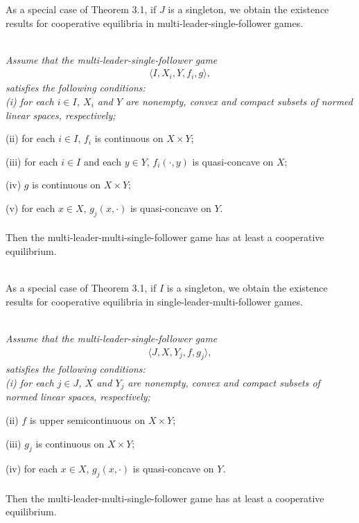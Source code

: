 As a special case of Theorem 3.1,
if $J$ is a singleton, we obtain the existence
results for cooperative equilibria in
multi-leader-single-follower games.
\\

~~{\it Assume that the
multi-leader-single-follower game
\begin{eqnarray*}
\langle I,X_i,Y,f_i,g\rangle,
\end{eqnarray*}
satisfies the following conditions:
\\

(i) for each $i\in I$, $X_i$ and $Y$ are nonempty, convex and
compact subsets of normed linear spaces, respectively;

(ii) for each $i\in I$, $f_i$ is continuous on $X\times Y$;

(iii) for each $i\in I$ and each $y\in Y$, $f_i(\cdot,y)$ is quasi-concave on $X$;

(iv) $g$ is continuous on $X\times Y$;

(v)  for each $x\in X$, $g_j(x,\cdot)$ is quasi-concave on $Y$.
\\
\\
Then the multi-leader-multi-single-follower game
has at least a cooperative equilibrium.}
\\

As a special case of Theorem 3.1,
if $I$ is a singleton,
we obtain the existence
results for cooperative equilibria in
single-leader-multi-follower games.
\\

~~{\it Assume that the
multi-leader-single-follower game
\begin{eqnarray*}
\langle J,X,Y_j,f,g_j\rangle,
\end{eqnarray*}
satisfies the following conditions:
\\

(i) for each $j\in J$, $X$ and $Y_j$ are nonempty, convex and
compact subsets of normed linear spaces, respectively;

(ii) $f$ is upper semicontinuous on $X\times Y$;

(iii) $g_j$ is continuous on $X\times Y$;

(iv)  for each $x\in X$, $g_j(x,\cdot)$ is quasi-concave on $Y$.
\\
\\
Then the multi-leader-multi-single-follower game
has at least a cooperative equilibrium.}
\\




